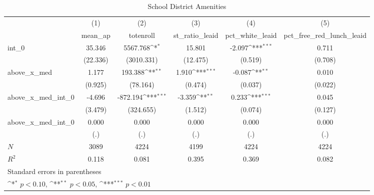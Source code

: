 \begin{table}[htbp]\centering
\def\sym#1{\ifmmode^{#1}\else\(^{#1}\)\fi}
\caption{School District Amenities}
\begin{tabular}{l*{5}{c}}
\hline\hline
            &\multicolumn{1}{c}{(1)}&\multicolumn{1}{c}{(2)}&\multicolumn{1}{c}{(3)}&\multicolumn{1}{c}{(4)}&\multicolumn{1}{c}{(5)}\\
            &\multicolumn{1}{c}{mean\_ap}&\multicolumn{1}{c}{totenroll}&\multicolumn{1}{c}{st\_ratio\_leaid}&\multicolumn{1}{c}{pct\_white\_leaid}&\multicolumn{1}{c}{pct\_free\_red\_lunch\_leaid}\\
\hline
int\_0       &      35.346         &    5567.768\sym{*}  &      15.801         &      -2.097\sym{***}&       0.711         \\
            &    (22.336)         &  (3010.331)         &    (12.475)         &     (0.519)         &     (0.708)         \\
[1em]
above\_x\_med &       1.177         &     193.388\sym{**} &       1.910\sym{***}&      -0.087\sym{**} &       0.010         \\
            &     (0.925)         &    (78.164)         &     (0.474)         &     (0.037)         &     (0.022)         \\
[1em]
above\_x\_med\_int\_0&      -4.696         &    -872.194\sym{***}&      -3.359\sym{**} &       0.233\sym{***}&       0.045         \\
            &     (3.479)         &   (324.655)         &     (1.512)         &     (0.074)         &     (0.127)         \\
[1em]
above\_x\_med\_int\_0&       0.000         &       0.000         &       0.000         &       0.000         &       0.000         \\
            &         (.)         &         (.)         &         (.)         &         (.)         &         (.)         \\
\hline
\(N\)       &        3089         &        4224         &        4199         &        4224         &        4224         \\
\(R^{2}\)   &       0.118         &       0.081         &       0.395         &       0.369         &       0.082         \\
\hline\hline
\multicolumn{6}{l}{\footnotesize Standard errors in parentheses}\\
\multicolumn{6}{l}{\footnotesize \sym{*} \(p<0.10\), \sym{**} \(p<0.05\), \sym{***} \(p<0.01\)}\\
\end{tabular}
\end{table}
